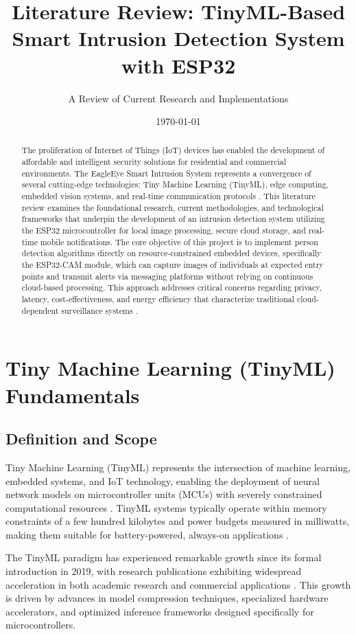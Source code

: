 \documentclass[12pt, a4paper]{article}
\title{\textbf{Literature Review: TinyML-Based Smart Intrusion Detection System with ESP32}}
\author{A Review of Current Research and Implementations}
\date{\today}
\begin{document}
\maketitle

\begin{abstract}
The proliferation of Internet of Things (IoT) devices has enabled the development of affordable and intelligent security solutions for residential and commercial environments. The EagleEye Smart Intrusion System represents a convergence of several cutting-edge technologies: Tiny Machine Learning (TinyML), edge computing, embedded vision systems, and real-time communication protocols \cite{ref1, ref2}. This literature review examines the foundational research, current methodologies, and technological frameworks that underpin the development of an intrusion detection system utilizing the ESP32 microcontroller for local image processing, secure cloud storage, and real-time mobile notifications. The core objective of this project is to implement person detection algorithms directly on resource-constrained embedded devices, specifically the ESP32-CAM module, which can capture images of individuals at expected entry points and transmit alerts via messaging platforms without relying on continuous cloud-based processing. This approach addresses critical concerns regarding privacy, latency, cost-effectiveness, and energy efficiency that characterize traditional cloud-dependent surveillance systems \cite{ref2}.
\end{abstract}

\section{Tiny Machine Learning (TinyML) Fundamentals}

\subsection{Definition and Scope}
Tiny Machine Learning (TinyML) represents the intersection of machine learning, embedded systems, and IoT technology, enabling the deployment of neural network models on microcontroller units (MCUs) with severely constrained computational resources \cite{ref4, ref5}. TinyML systems typically operate within memory constraints of a few hundred kilobytes and power budgets measured in milliwatts, making them suitable for battery-powered, always-on applications \cite{ref6, ref7}.

The TinyML paradigm has experienced remarkable growth since its formal introduction in 2019, with research publications exhibiting widespread acceleration in both academic research and commercial applications \cite{ref8}. This growth is driven by advances in model compression techniques, specialized hardware accelerators, and optimized inference frameworks designed specifically for microcontrollers.
\end{document}
